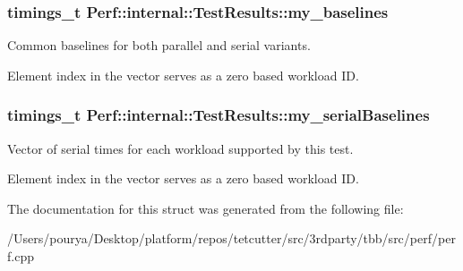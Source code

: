\subsubsection[{my\+\_\+baselines}]{\setlength{\rightskip}{0pt plus 5cm}timings\+\_\+t Perf\+::internal\+::\+Test\+Results\+::my\+\_\+baselines}\label{structPerf_1_1internal_1_1TestResults_a7d42b5547c38daedbdf14aa51ce3e2fc}


Common baselines for both parallel and serial variants. 

Element index in the vector serves as a zero based workload I\+D. \hypertarget{structPerf_1_1internal_1_1TestResults_a32c0056ff414a92af0bf887c7dd47fc4}{}
\subsubsection[{my\+\_\+serial\+Baselines}]{\setlength{\rightskip}{0pt plus 5cm}timings\+\_\+t Perf\+::internal\+::\+Test\+Results\+::my\+\_\+serial\+Baselines}\label{structPerf_1_1internal_1_1TestResults_a32c0056ff414a92af0bf887c7dd47fc4}


Vector of serial times for each workload supported by this test. 

Element index in the vector serves as a zero based workload I\+D. 

The documentation for this struct was generated from the following file\+:\begin{DoxyCompactItemize}
\item 
/\+Users/pourya/\+Desktop/platform/repos/tetcutter/src/3rdparty/tbb/src/perf/perf.\+cpp\end{DoxyCompactItemize}
